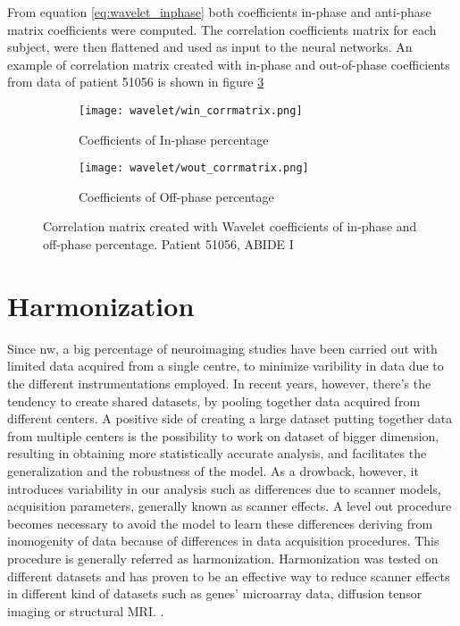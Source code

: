 \documentclass[10pt]{report}
\begin{document}
From equation \ref{eq:wavelet_inphase} both coefficients in-phase and anti-phase matrix coefficients were computed.
The correlation coefficients matrix for each subject, were then flattened and used as input to the neural networks.
An example of correlation matrix created with in-phase and out-of-phase coefficients from data of patient 51056 is shown in figure \ref{fig:win_wout}



\begin{figure}
\centering
\begin{subfigure}{0.45\textwidth}
\texttt{[image: wavelet/win\_corrmatrix.png]}
\caption{Coefficients of In-phase percentage}
\label{}
\end{subfigure}
\begin{subfigure}{0.45\textwidth}
\texttt{[image: wavelet/wout\_corrmatrix.png]}
\caption{Coefficients of Off-phase percentage}
\label{}
\end{subfigure}
\caption{Correlation matrix created with Wavelet coefficients of in-phase and off-phase percentage. Patient 51056, ABIDE I }
\label{fig:win_wout}
\end{figure}



\newpage


\chapter{Harmonization}
Since nw, a big percentage of neuroimaging studies have been carried out with limited data acquired from a single centre, to minimize varibility in data due to the different instrumentations employed.
In recent years, however, there's the tendency to create shared datasets, by pooling together data acquired from different centers.
A positive side of creating a large dataset putting together data from multiple centers is the possibility to work on dataset of bigger dimension, resulting in obtaining more statistically accurate analysis, and facilitates the generalization and the robustness of the model.
As a drowback, however, it introduces variability in our analysis such as differences due to scanner models, acquisition parameters, generally known as scanner effects.
A level out procedure becomes necessary to avoid the model to learn these differences deriving from inomogenity of data because of differences in data acquisition procedures.
This procedure is generally referred as harmonization.
Harmonization was tested on different datasets and has proven to be an effective way to reduce scanner effects  in different kind of datasets such as genes' microarray data, diffusion tensor imaging or structural MRI. \cite{johnson-2006} \cite{fortin-2017} \cite{lombardi2020}.
\end{document}
